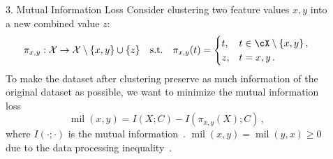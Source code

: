 \documentclass[final]{beamer}
\DeclareMathOperator{\pr}{Pr}
\DeclareMathOperator{\mil}{mil}
\newcommand{\ie}{\emph{i.e.}\xspace}
\newlength{\sepwid}
\newlength{\onecolwid}
\begin{document}
\begin{frame}[t]
\begin{columns}[t]
\begin{column}{\onecolwid}
\begin{block}{3. Mutual Information Loss}
		Consider clustering two feature values $ x,y $ into a new combined 
		value $ 
		z $:
		\[ 
		\pi_{x,y}: \mathcal{X}\to \mathcal{X}\setminus\{x,y\}\cup 
		\{z\}\quad\text{s.t.}\quad \pi_{x,y}(t) = \begin{cases}
		t, & t\in \cX\setminus \{x, y\}\,,\\
		z, & t = x,y\,.
		\end{cases}
		\]
		To make the dataset after clustering
		preserve as much information of the original dataset as 
		possible, 
		we want to minimize
		the mutual 
		information loss 
		\[\mil(x,y) = I(X;C) - I(\pi_{x,y}(X);C)\,,\]
		where $I(\cdot;\cdot)$ is the mutual 
		information~\cite{cover2012elements}.
		$ \mil(x,y)=\mil(y,x)\ge 0 $ due to the data processing 
		inequality~\cite{cover2012elements}.
	\end{block}
		\end{column} %
 		\begin{column}{\sepwid}\end{column} %
\begin{column}{\onecolwid} %
\vspace{-40pt}


\end{column}
\end{columns}
\end{frame}
\end{document}
